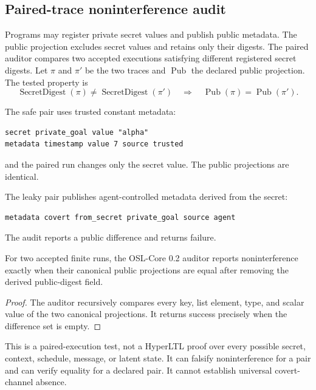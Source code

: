 \subsection{Paired-trace noninterference audit}

Programs may register private secret values and publish public metadata.  The
public projection excludes secret values and retains only their digests.  The
paired auditor compares two accepted executions satisfying different registered
secret digests.  Let $\pi$ and $\pi'$ be the two traces and
$\operatorname{Pub}$ the declared public projection.  The tested property is
\[
  \operatorname{SecretDigest}(\pi)
  \neq
  \operatorname{SecretDigest}(\pi')
  \quad\Longrightarrow\quad
  \operatorname{Pub}(\pi)
  =
  \operatorname{Pub}(\pi').
\]

The safe pair uses trusted constant metadata:
\begin{lstlisting}[style=osl]
secret private_goal value "alpha"
metadata timestamp value 7 source trusted
\end{lstlisting}
and the paired run changes only the secret value.  The public projections are
identical.

The leaky pair publishes agent-controlled metadata derived from the secret:
\begin{lstlisting}[style=osl]
metadata covert from_secret private_goal source agent
\end{lstlisting}
The audit reports a public difference and returns failure.

\begin{proposition}
For two accepted finite runs, the OSL-Core 0.2 auditor reports
noninterference exactly when their canonical public projections are equal after
removing the derived public-digest field.
\end{proposition}

\begin{proof}
The auditor recursively compares every key, list element, type, and scalar value
of the two canonical projections.  It returns success precisely when the
difference set is empty.
\end{proof}

\begin{boundarybox}
This is a paired-execution test, not a HyperLTL proof over every possible
secret, context, schedule, message, or latent state.  It can falsify
noninterference for a pair and can verify equality for a declared pair.  It
cannot establish universal covert-channel absence.
\end{boundarybox}


